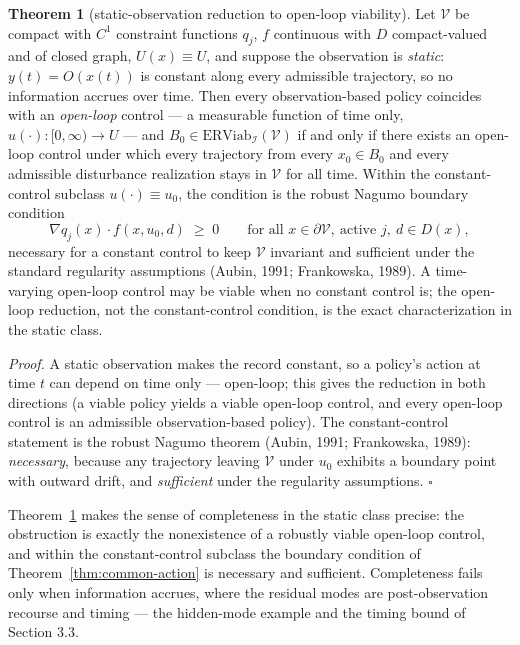 \documentclass[10pt,twocolumn]{article}
\theoremstyle{definition}
\newtheorem{theorem}{Theorem}
\begin{document}
\begin{theorem}[static-observation reduction to open-loop viability]\label{thm:static-complete}
Let \(\mathcal{V}\) be compact with \(C^{1}\) constraint functions \(q_{j}\), \(f\) continuous with \(D\) compact-valued and of closed graph, \(U(x) \equiv U\), and suppose the observation is \emph{static}: \(y(t) = O(x(t))\) is constant along every admissible trajectory, so no information accrues over time. Then every observation-based policy coincides with an \emph{open-loop} control --- a measurable function of time only, \(u(\cdot):[0,\infty)\to U\) --- and \(B_{0} \in \mathrm{ERViab}_{\mathcal{I}}(\mathcal{V})\) if and only if there exists an open-loop control under which every trajectory from every \(x_{0} \in B_{0}\) and every admissible disturbance realization stays in \(\mathcal{V}\) for all time. Within the constant-control subclass \(u(\cdot) \equiv u_{0}\), the condition is the robust Nagumo boundary condition
\[
\nabla q_{j}(x) \cdot f(x, u_{0}, d) \;\ge\; 0
\qquad \text{for all } x \in \partial\mathcal{V},\ \text{active } j,\ d \in D(x),
\]
necessary for a constant control to keep \(\mathcal{V}\) invariant and sufficient under the standard regularity assumptions (Aubin, 1991; Frankowska, 1989). A time-varying open-loop control may be viable when no constant control is; the open-loop reduction, not the constant-control condition, is the exact characterization in the static class.
\end{theorem}

\emph{Proof.} A static observation makes the record constant, so a policy's action at time \(t\) can depend on time only --- open-loop; this gives the reduction in both directions (a viable policy yields a viable open-loop control, and every open-loop control is an admissible observation-based policy). The constant-control statement is the robust Nagumo theorem (Aubin, 1991; Frankowska, 1989): \emph{necessary}, because any trajectory leaving \(\mathcal{V}\) under \(u_{0}\) exhibits a boundary point with outward drift, and \emph{sufficient} under the regularity assumptions. \hfill\(\square\)

Theorem~\ref{thm:static-complete} makes the sense of completeness in the static class precise: the obstruction is exactly the nonexistence of a robustly viable open-loop control, and within the constant-control subclass the boundary condition of Theorem~\ref{thm:common-action} is necessary and sufficient. Completeness fails only when information accrues, where the residual modes are post-observation recourse and timing --- the hidden-mode example and the timing bound of Section 3.3.
\end{document}
